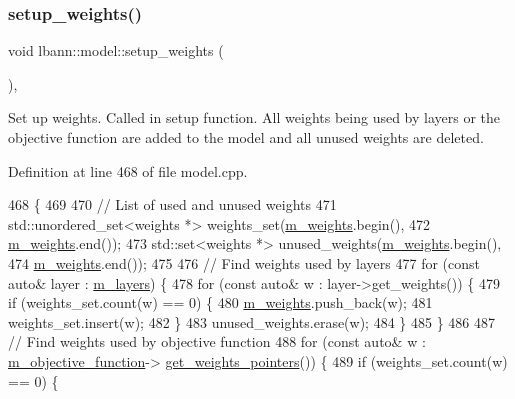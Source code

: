 \subsubsection{\texorpdfstring{setup\+\_\+weights()}{setup\_weights()}}
{\footnotesize\ttfamily void lbann\+::model\+::setup\+\_\+weights (\begin{DoxyParamCaption}{ }\end{DoxyParamCaption})\hspace{0.3cm}{\ttfamily [protected]}, {\ttfamily [virtual]}}

Set up weights. Called in setup function. All weights being used by layers or the objective function are added to the model and all unused weights are deleted. 

Definition at line 468 of file model.\+cpp.


\begin{DoxyCode}
468                           \{
469 
470   \textcolor{comment}{// List of used and unused weights}
471   std::unordered\_set<weights *> weights\_set(\hyperlink{classlbann_1_1model_aaf9adefe4497d90bf5bc2567e71bfb00}{m\_weights}.begin(),
472                                             \hyperlink{classlbann_1_1model_aaf9adefe4497d90bf5bc2567e71bfb00}{m\_weights}.end());
473   std::set<weights *> unused\_weights(\hyperlink{classlbann_1_1model_aaf9adefe4497d90bf5bc2567e71bfb00}{m\_weights}.begin(),
474                                      \hyperlink{classlbann_1_1model_aaf9adefe4497d90bf5bc2567e71bfb00}{m\_weights}.end());
475 
476   \textcolor{comment}{// Find weights used by layers}
477   \textcolor{keywordflow}{for} (\textcolor{keyword}{const} \textcolor{keyword}{auto}& layer : \hyperlink{classlbann_1_1model_a0229fc226ec163d1411548446104569d}{m\_layers}) \{
478     \textcolor{keywordflow}{for} (\textcolor{keyword}{const} \textcolor{keyword}{auto}& w : layer->get\_weights()) \{
479       \textcolor{keywordflow}{if} (weights\_set.count(w) == 0) \{
480         \hyperlink{classlbann_1_1model_aaf9adefe4497d90bf5bc2567e71bfb00}{m\_weights}.push\_back(w);
481         weights\_set.insert(w);
482       \}
483       unused\_weights.erase(w);
484     \}
485   \}
486 
487   \textcolor{comment}{// Find weights used by objective function}
488   \textcolor{keywordflow}{for} (\textcolor{keyword}{const} \textcolor{keyword}{auto}& w : \hyperlink{classlbann_1_1model_a24c50e7108dd7698671aed7df5b22e8b}{m\_objective\_function}->
      \hyperlink{classlbann_1_1objective__function_a8e37f76e42f6f341ea3592001b3794e5}{get\_weights\_pointers}()) \{
489     \textcolor{keywordflow}{if} (weights\_set.count(w) == 0) \{

\end{DoxyCode}
